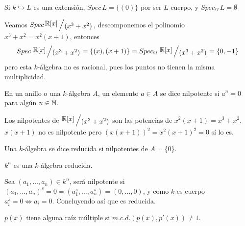 \begin{ejem}
    Si $k \hookrightarrow L$ es una extensi\'on, $Spec\, L = \{(0)\}$ por ser $L$ cuerpo, y  $Spec_{\Omega}\, L = \emptyset$
\end{ejem}
\begin{ejem}
    Veamos $Spec\, \modulo{\bb R[x]}{(x^3+x^2)}$, descomponemos el polinomio $x^3+x^2 = x^2(x+1)$, entonces $$Spec\, \, \modulo{\bb R[x]}{(x^3+x^2)} = \{(x), (x+1)\} = Spec_{\Omega}\, \, \modulo{\bb R[x]}{(x^3+x^2)} = \{0, -1\} $$
    pero esta $k$-\'algebra no es racional, pues los puntos no tienen la misma multiplicidad. 
\end{ejem}
\begin{defi}
    En un anillo o una $k$-\'algebra $A$, un elemento $a\in A$ se dice nilpotente si $a^n=0$ para alg\'un $n \in \mathbb{N}$. 
\end{defi}
\begin{ejem}
    Los nilpotentes de $\modulo{\bb R[x]}{(x^3+x^2)}$ son las potencias de $x^2(x+1) = x^3+x^2$. $x(x+1)$ no es nilpotente pero $(x(x+1))^2 = x^2 (x+1)^2=0$ s\'i lo es.
\end{ejem}
\begin{defi}
    Una $k$-\'algebra se dice reducida si nilpotentes de $A = \{0\}$.
\end{defi}
\begin{prop}
    $k^n$ es una $k$-\'algebra reducida. 
\end{prop}
\begin{dem}
    Sea $(a_1, \ldots, a_n)\in k^n$, ser\'a nilpotente si $(a_1, \ldots, a_n)^s = 0 = (a_1^s, \ldots, a_n^s)= (0,\ldots, 0)$, y como $k$ es cuerpo $a_i^s = 0 \iff a_i = 0$. Concluyendo as\'i que es reducida. 
\end{dem}
\begin{prop}
    $p(x)$ tiene alguna ra\'iz m\'ultiple si $m.c.d.(p(x), p'(x))\neq 1$. 
\end{prop}

